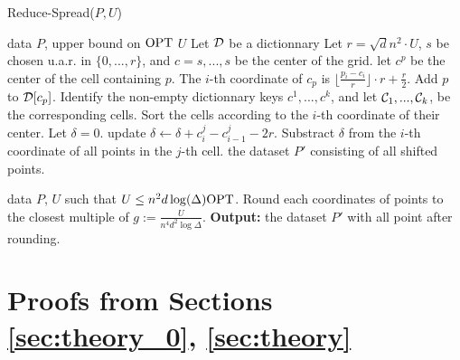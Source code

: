 \begin{algorithm}[tb]
   \caption{Reduce-Spread($P, U$)}
   \label{alg:reduce-diam}
\begin{algorithmic}[1]
 \Comment data $P$, upper bound on $\text{OPT}$ $U$
   \State Let $\mathcal D$ be a dictionnary
   \State Let $r = \sqrt d n^2\cdot U$, $s$ be chosen u.a.r. in $\{0, ..., r\}$, and $c = {s, ..., s}$ be the center of the grid.
   \State let $c^p$ be the center of the cell containing $p$. The $i$-th coordinate of $c_p$ is $\lfloor \frac{p_i - c_i}{r}\rfloor  \cdot r + \frac{r}{2}$.
   Add $p$ to $\mathcal D[c_p]$.
   \EndFor
   \State Identify the non-empty dictionnary keys $c^1, ..., c^k$, and let $\mathcal C_1, ..., \mathcal C_k$, be the corresponding cells.
   \State Sort the cells according to the $i$-th coordinate of their center. Let $\delta = 0$. 
     update $\delta \gets \delta + c^j_i - c^j_{i-1} - 2r$.
	\EndIf    
    \State Substract $\delta$ from the $i$-th coordinate of all points in the $j$-th cell. 
    \EndFor
   \EndFor
    the dataset $P'$ consisting of all shifted points.
   \EndProcedure
   
    \Comment data $P$, $U$ such that $U \leq n^2 d \log(\Delta) \text{OPT}$.
   \State Round each coordinates of points to the closest multiple of $g := \frac{U}{n^4 d^2 \log \Delta}$.
   \State \textbf{Output:} the dataset $P'$ with all point after rounding.
   \EndProcedure
\end{algorithmic}
\end{algorithm}

\section{Proofs from Sections \ref{sec:theory_0}, \ref{sec:theory}}\label{app:theory}
